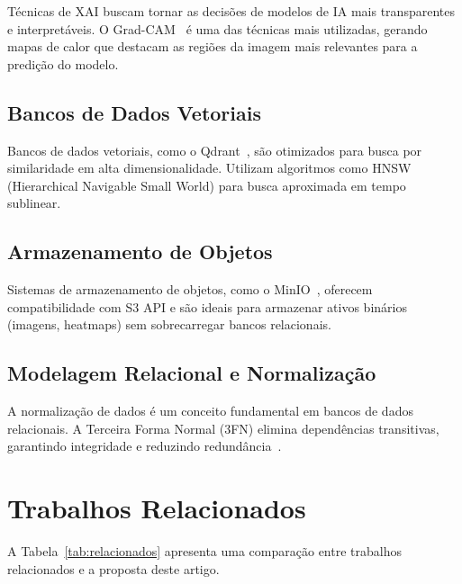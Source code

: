 \documentclass[12pt,a4paper,twoside]{article}
\begin{document}
Técnicas de XAI buscam tornar as decisões de modelos de IA mais transparentes e interpretáveis. O Grad-CAM~\cite{selvaraju2017grad} é uma das técnicas mais utilizadas, gerando mapas de calor que destacam as regiões da imagem mais relevantes para a predição do modelo.

\subsection{Bancos de Dados Vetoriais}

Bancos de dados vetoriais, como o Qdrant~\cite{qdrant2021}, são otimizados para busca por similaridade em alta dimensionalidade. Utilizam algoritmos como HNSW (Hierarchical Navigable Small World) para busca aproximada em tempo sublinear.

\subsection{Armazenamento de Objetos}

Sistemas de armazenamento de objetos, como o MinIO~\cite{minio2021}, oferecem compatibilidade com S3 API e são ideais para armazenar ativos binários (imagens, heatmaps) sem sobrecarregar bancos relacionais.

\subsection{Modelagem Relacional e Normalização}

A normalização de dados é um conceito fundamental em bancos de dados relacionais. A Terceira Forma Normal (3FN) elimina dependências transitivas, garantindo integridade e reduzindo redundância~\cite{date2004introduction}.

\section{Trabalhos Relacionados}
\label{sec:relacionados}

A Tabela~\ref{tab:relacionados} apresenta uma comparação entre trabalhos relacionados e a proposta deste artigo.
\end{document}
